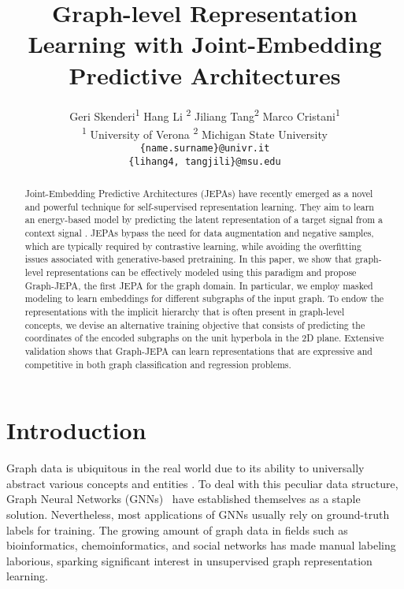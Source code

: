 \documentclass{article} \usepackage{iclr2024_conference,times}
\title{Graph-level Representation Learning with Joint-Embedding Predictive Architectures}
\author{Geri Skenderi\textsuperscript{1} \quad Hang Li \textsuperscript{2} \quad Jiliang Tang\textsuperscript{2} \quad Marco Cristani\textsuperscript{1} \\
\textsuperscript{1} University of Verona \quad \textsuperscript{2} Michigan State University
\\
\texttt{\{name.surname\}@univr.it} \\
\texttt{\{lihang4, tangjili\}@msu.edu}
}
\begin{document}
\maketitle

\begin{abstract}
   Joint-Embedding Predictive Architectures (JEPAs) have recently emerged as a novel and powerful technique for self-supervised representation learning. They aim to learn an energy-based model by predicting the latent representation of a target signal  from a context signal . JEPAs bypass the need for data augmentation and negative samples, which are typically required by contrastive learning, while avoiding the overfitting issues associated with generative-based pretraining. In this paper, we show that graph-level representations can be effectively modeled using this paradigm and propose Graph-JEPA, the first JEPA for the graph domain. In particular, we employ masked modeling to learn embeddings for different subgraphs of the input graph. To endow the representations with the implicit hierarchy that is often present in graph-level concepts, we devise an alternative training objective that consists of predicting the coordinates of the encoded subgraphs on the unit hyperbola in the 2D plane. Extensive validation shows that Graph-JEPA can learn representations that are expressive and competitive in both graph classification and regression problems.
\end{abstract}

\section{Introduction}

Graph data is ubiquitous in the real world due to its ability to universally abstract various concepts and entities \citep{ma_tang_2021,velivckovic2023everything}. To deal with this peculiar data structure, Graph Neural Networks (GNNs)~\citep{scarselli2008graph,kipf2016semi,gilmer2017neural,velivckovic2017graph} have established themselves as a staple solution. Nevertheless, most applications of GNNs usually rely on ground-truth labels for training. The growing amount of graph data in fields such as bioinformatics, chemoinformatics, and social networks has made manual labeling laborious, sparking significant interest in unsupervised graph representation learning.
\end{document}
